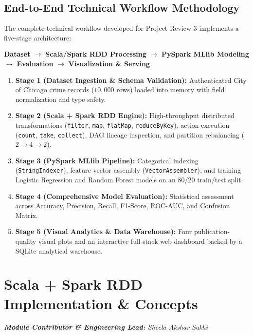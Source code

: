 \documentclass[11pt,a4paper]{article}
\begin{document}
\subsection{End-to-End Technical Workflow Methodology}
The complete technical workflow developed for Project Review 3 implements a five-stage architecture:
\begin{center}
\textbf{Dataset} $\longrightarrow$ \textbf{Scala/Spark RDD Processing} $\longrightarrow$ \textbf{PySpark MLlib Modeling} $\longrightarrow$ \textbf{Evaluation} $\longrightarrow$ \textbf{Visualization \& Serving}
\end{center}
\begin{enumerate}
    \item \textbf{Stage 1 (Dataset Ingestion \& Schema Validation):} Authenticated City of Chicago crime records ($10,000$ rows) loaded into memory with field normalization and type safety.
    \item \textbf{Stage 2 (Scala + Spark RDD Engine):} High-throughput distributed transformations (\texttt{filter}, \texttt{map}, \texttt{flatMap}, \texttt{reduceByKey}), action execution (\texttt{count}, \texttt{take}, \texttt{collect}), DAG lineage inspection, and partition rebalancing ($2 \to 4 \to 2$).
    \item \textbf{Stage 3 (PySpark MLlib Pipeline):} Categorical indexing (\texttt{StringIndexer}), feature vector assembly (\texttt{VectorAssembler}), and training Logistic Regression and Random Forest models on an 80/20 train/test split.
    \item \textbf{Stage 4 (Comprehensive Model Evaluation):} Statistical assessment across Accuracy, Precision, Recall, F1-Score, ROC-AUC, and Confusion Matrix.
    \item \textbf{Stage 5 (Visual Analytics \& Data Warehouse):} Four publication-quality visual plots and an interactive full-stack web dashboard backed by a SQLite analytical warehouse.
\end{enumerate}

\section{Scala + Spark RDD Implementation \& Concepts}
\noindent\textit{\textbf{Module Contributor \& Engineering Lead:} Sheela Akshar Sakhi}
\end{document}
